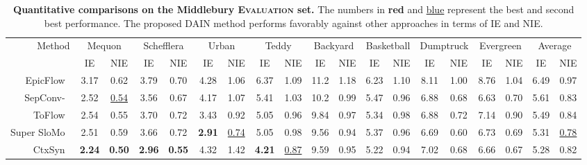 \documentclass[10pt,twocolumn,letterpaper]{article}
\def\red#1{\textcolor{MyRed}{#1}}
\def\blue#1{\textcolor{MyBlue}{#1}}
\def\first#1{\red{\textbf{#1}}}
\def\second#1{\blue{\underline{#1}}}
\begin{document}
%
 	
	
	
	\begin{table*} 
 \caption{
 	\textbf{Quantitative comparisons on the Middlebury \textsc{Evaluation} set.} 
The numbers in \first{red} and \second{blue} represent the best and second best performance.
The proposed DAIN method performs favorably against other approaches in terms of IE and NIE.
 	}
 \label{tab:Middlebury}
 \vspace{-2mm}
\footnotesize
\renewcommand{\tabcolsep}{5pt} \renewcommand{\arraystretch}{1} \centering
\begin{tabular}{rcccccccccccccccc|cc}
\toprule
\multirow{2}{*}[-0.28em]{Method}& \multicolumn{2}{c}{Mequon} & \multicolumn{2}{c}{Schefflera} & \multicolumn{2}{c}{Urban} & \multicolumn{2}{c}{Teddy} & \multicolumn{2}{c}{Backyard} & \multicolumn{2}{c}{Basketball} & \multicolumn{2}{c}{Dumptruck} & \multicolumn{2}{c}{Evergreen} & \multicolumn{2}{c}{{Average}}\\
\cmidrule(l{2pt}r{2pt}){2-3}
\cmidrule(l{2pt}r{2pt}){4-5}
\cmidrule(l{2pt}r{2pt}){6-7}
\cmidrule(l{2pt}r{2pt}){8-9}
\cmidrule(l{2pt}r{2pt}){10-11}
\cmidrule(l{2pt}r{2pt}){12-13}
\cmidrule(l{2pt}r{2pt}){14-15}
\cmidrule(l{2pt}r{2pt}){16-17}
\cmidrule(l{2pt}r{2pt}){18-19}
&IE & NIE&IE & NIE&IE & NIE&IE & NIE&IE & NIE&IE & NIE&IE & NIE&IE & NIE&IE & NIE\\
\addlinespace[-1pt]
\midrule


EpicFlow~\cite{revaud2015epicflow} 		    &3.17	&0.62 	&3.79    &0.70      &4.28        &1.06      &6.37     &1.09 	 &11.2      &1.18 &6.23   &1.10    &8.11 &1.00    	&8.76      &1.04  &6.49   &0.97  \\


SepConv-~\cite{niklaus2017videoSepConv} &{2.52} 	 &\second{0.54}  &3.56 	 &0.67   	&4.17 		 &1.07  	&5.41 	  &	1.03 	&10.2 & 	0.99 &5.47 	 &	{0.96}  	&6.88 & 0.68  	&{6.63} & 	0.70 	&5.61   &	0.83 	 \\

ToFlow~\cite{xue2017video} &2.54 &0.55 & 3.70 & 0.72 & 3.43 &0.92 &5.05 &0.96 & 9.84 &0.97 & 5.34 & 0.98 & 6.88 & 0.72 & 7.14 &0.90 &5.49 & 0.84 \\

Super SloMo~\cite{jiang2017super}	&{2.51} 	 &0.59  &3.66 	 &0.72   	&\first{2.91} 		 &\second{0.74}  	&{5.05} 	  &	0.98 	&9.56  &	0.94 &5.37 	 &	{0.96}  	&6.69 & 0.60  	&6.73 & 	{0.69} 	&{5.31}   &	\second{0.78} 	 \\

CtxSyn~\cite{niklaus2018context}	&\first{2.24} 	 &\first{0.50} &\first{2.96} 	 &\first{0.55}   	&{4.32} 		 &{1.42}  	&\first{4.21} 	  &	\second{0.87}	&9.59  &	0.95 &5.22 	 &	{0.94}  	&7.02 & 0.68  	&6.66 & 	{0.67} 	&{5.28}   &	{0.82} 	 \\



\end{tabular}
\end{table*}
\end{document}
